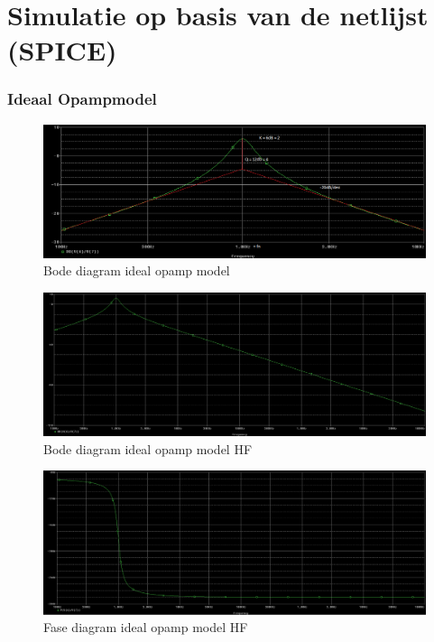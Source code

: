 \documentclass[]{article}
\begin{document}
\section{Simulatie op basis van de netlijst (SPICE)}

\subsubsection*{Ideaal Opampmodel}

\begin{figure}[H]
	\centering
	\includegraphics[width=13cm]{bode_ideaal_smal}
	\caption{Bode diagram ideal opamp model}
\end{figure}

\begin{figure}[H]
	\centering
	\includegraphics[width=13cm]{bode_ideaal}
	\caption{Bode diagram ideal opamp model HF}
\end{figure}

\begin{figure}[H]
	\centering
	\includegraphics[width=13cm]{fase_ideaal}
	\caption{Fase diagram ideal opamp model HF}
\end{figure}
\end{document}
